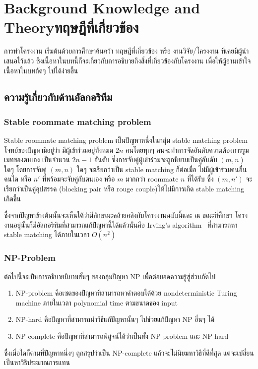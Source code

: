 \chapter{\ifenglish Background Knowledge and Theory\else ทฤษฎีที่เกี่ยวข้อง\fi}

การทำโครงงาน เริ่มต้นด้วยการศึกษาค้นคว้า ทฤษฎีที่เกี่ยวข้อง หรือ งานวิจัย/โครงงาน 
ที่เคยมีผู้นำเสนอไว้แล้ว ซึ่งเนื้อหาในบทนี้ก็จะเกี่ยวกับการอธิบายถึงสิ่งที่เกี่ยวข้องกับโครงงาน 
เพื่อให้ผู้อ่านเข้าใจเนื้อหาในบทถัดๆ ไปได้ง่ายขึ้น

\section{ความรู้เกี่ยวกับด้านอัลกอริทึม}
\subsection{Stable roommate matching problem}
Stable roommate matching problem เป็นปัญหาหนึ่งในกลุ่ม stable matching problem
โจทย์ของปัญหามีอยู่ว่า มีผู้เข้าร่วมอยู่ทั้งหมด $2n$ คนโดยทุกๆ คนจะทำการจัดอันดับความต้องการรูมเมทของตนเอง
เป็นจำนวน $2n-1$ อันดับ ซึ่งการจับคู่ผู้เข้าร่วมจะถูกนิยามเป็นคู่อันดับ $(m,n)$ ใดๆ โดยการจับคู่ $(m,n)$ ใดๆ จะเรียกว่าเป็น
stable matching ก็ต่อเมื่อ ไม่มีผู้เข้าร่วมคนอื่นคนใด หรือ $n'$ ที่พร้อมจะจับคู่กับตนเอง หรือ $m$ มากกว่า roommate $n$ ที่ได้รับ ซึ่ง $(m, n')$
จะเรียกว่าเป็นคู่อุปสรรค (blocking pair หรือ rouge couple)ให้ไม่มีการเกิด stable matching เกิดขึ้น

ซึ่งจากปัญหาข้างต้นนั้นจะเห็นได้ว่ามีลักษณะคล้ายคลึงกับโครงงานฉบับนี้และ ณ ขณะที่ศึกษา
โครงงานอยู่นั้นก็มีอัลกอริทึมที่สามารถแก้ปัญหานี้ได้แล้วนั่นคือ Irving's algorithm~\cite{irving1985efficient} ที่สามารถหา 
stable matching ได้ภายในเวลา $O(n^2)$

\subsection{NP-Problem}
ต่อไปนี้จะเป็นการอธิบายนิยามสั้นๆ ของกลุ่มปัญหา NP เพื่อต่อยอดความรู้สู่ส่วนถัดไป
\begin{enumerate}
  \item NP-problem คือเซตของปัญหาที่สามารถหาคำตอบได้ด้วย nondeterministic 
    Turing machine ภายในเวลา polynomial time ตามขนาดของ input
  \item  NP-hard คือปัญหาที่สามารถนำวิธีแก้ปัญหานั้นๆ ไปช่วยแก้ปัญหา NP อื่นๆ ได้
  \item  NP-complete คือปัญหาที่สามารถพิสูจน์ได้ว่าเป็นทั้ง NP-problem และ NP-hard
\end{enumerate}
ซึ่งเมื่อใดก็ตามที่ปัญหาหนึ่งๆ ถูกสรุปว่าเป็น NP-complete แล้วจะไม่นิยมหาวิธีที่ดีที่สุด
แต่จะเปลี่ยนเป็นหาวิธีประมาณการแทน

